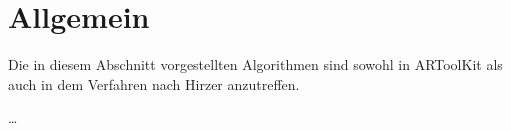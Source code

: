 \section{Allgemein} %
\label{sec:allgemein}

Die in diesem Abschnitt vorgestellten Algorithmen sind sowohl in ARToolKit als auch in dem Verfahren nach Hirzer
 anzutreffen.

\ldots

